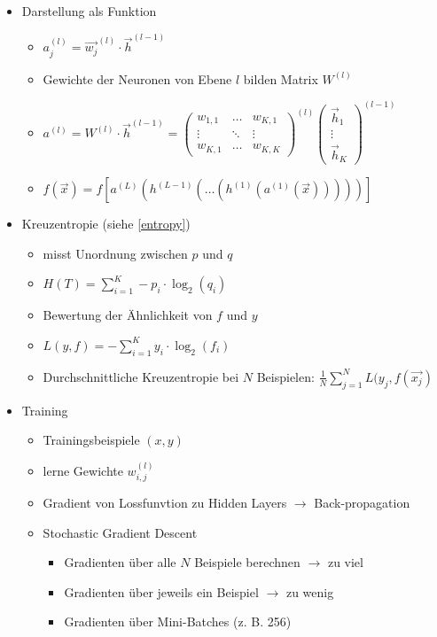 \documentclass[nonacm=true, language=german]{acmart}
\begin{document}
\begin{itemize}
    \item Darstellung als Funktion
    \begin{itemize}
        \item $ a_j^{(l)} = \Vec{w_j}^{(l)} \cdot \Vec{h}^{(l-1)} $
        \item Gewichte der Neuronen von Ebene $l$ bilden Matrix $W^{(l)}$
        \item $ a^{(l)} = W^{(l)} \cdot \Vec{h}^{(l-1)} = \begin{pmatrix} w_{1,1} & \dots & w_{K,1} \\ \vdots & \ddots & \vdots \\ w_{K,1} & \dots & w_{K,K} \end{pmatrix}^{(l)} \begin{pmatrix} \Vec{h}_1 \\ \vdots \\ \Vec{h}_K \end{pmatrix}^{(l-1)} $
        \item $ f(\Vec{x}) = f[a^{(L)}(h^{(L-1)}(\dots(h^{(1)}(a^{(1)}(\Vec{x})))))] $
    \end{itemize}
    
    \item Kreuzentropie (siehe \ref{entropy})
    \begin{itemize}
        \item misst Unordnung zwischen $p$ und $q$
        \item $ H(T) = \displaystyle \sum_{i = 1}^K -p_i \cdot \log_2(q_i) $
        \item Bewertung der Ähnlichkeit von $f$ und $y$
        \item $ \displaystyle L(y, f) = - \sum_{i = 1}^K y_i \cdot \log_2(f_i) $
        \item Durchschnittliche Kreuzentropie bei $N$ Beispielen: $ \displaystyle \frac{1}{N} \sum_{j=1}^N L(y_j, f(\Vec{x_j}) $
    \end{itemize}
    
    \item Training
    \begin{itemize}
        \item Trainingsbeispiele $(x, y)$
        \item lerne Gewichte $w_{i,j}^{(l)}$
        \item Gradient von Lossfunvtion zu Hidden Layers $\rightarrow$ Back-propagation
        \item Stochastic Gradient Descent
        \begin{itemize}
            \item Gradienten über alle $N$ Beispiele berechnen $\rightarrow$ zu viel
            \item Gradienten über jeweils ein Beispiel $\rightarrow$ zu wenig
            \item Gradienten über Mini-Batches (z. B. 256)
        \end{itemize}
        

\end{itemize}
\end{itemize}
\end{document}

